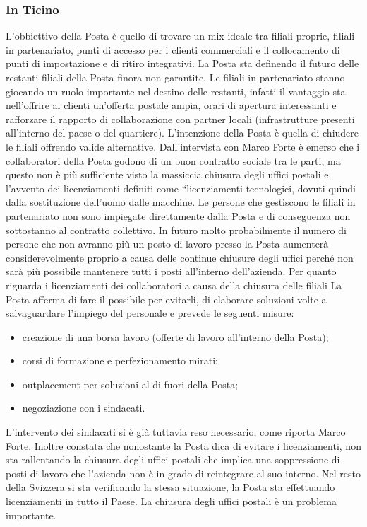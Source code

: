 \subsubsection{In Ticino}
L’obbiettivo della Posta è quello di trovare un mix ideale tra filiali proprie, filiali in partenariato, punti di accesso per i clienti commerciali e il collocamento di punti di impostazione e di ritiro integrativi.
La Posta sta definendo il futuro delle restanti filiali della Posta finora non garantite. Le filiali in partenariato stanno giocando un ruolo importante nel destino delle restanti, infatti il vantaggio sta nell’offrire ai clienti un’offerta postale ampia, orari di apertura interessanti e rafforzare il rapporto di collaborazione con partner locali (infrastrutture presenti all’interno del paese o del quartiere).
L’intenzione della Posta è quella di chiudere le filiali offrendo valide alternative.
Dall’intervista con Marco Forte è emerso che i collaboratori della Posta godono di un buon contratto sociale tra le parti, ma questo non è più sufficiente visto la massiccia chiusura degli uffici postali e l’avvento dei licenziamenti definiti come “licenziamenti tecnologici, dovuti quindi dalla sostituzione dell’uomo dalle macchine. Le persone che gestiscono le filiali in partenariato non sono impiegate direttamente dalla Posta e di conseguenza non sottostanno al contratto collettivo. In futuro molto probabilmente il numero di persone che non avranno più un posto di lavoro presso la Posta aumenterà considerevolmente proprio a causa delle continue chiusure degli uffici perché non sarà più possibile mantenere tutti i posti all’interno dell’azienda.
Per quanto riguarda i licenziamenti dei collaboratori a causa della chiusura delle filiali La Posta afferma di fare il possibile per evitarli, di elaborare soluzioni volte a salvaguardare l’impiego del personale e prevede le seguenti misure:
\begin{itemize}
    \item creazione di una borsa lavoro (offerte di lavoro all’interno della Posta);
    \item corsi di formazione e perfezionamento mirati;
    \item outplacement per soluzioni al di fuori della Posta;
    \item negoziazione con i sindacati.
\end{itemize}
L’intervento dei sindacati si è già tuttavia reso necessario, come riporta Marco Forte. Inoltre constata che nonostante la Posta dica di evitare i licenziamenti, non sta rallentando la chiusura degli uffici postali che implica una soppressione di posti di lavoro che l’azienda non è in grado di reintegrare al suo interno. Nel resto della Svizzera si sta verificando la stessa situazione, la Posta sta effettuando licenziamenti in tutto il Paese. La chiusura degli uffici postali è un problema importante.
